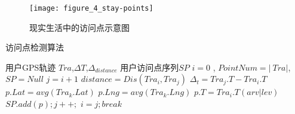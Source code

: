 
\begin{figure}[htp]
\centering
\texttt{[image: figure\_4\_stay-points]}
\caption{现实生活中的访问点示意图}
\label{fig:staypoint}
\end{figure}
\begin{algorithm}[htb]
\caption{访问点检测算法}
\label{alg2_1staypoint}
\begin{algorithmic}[1] %
				\REQUIRE 用户GPS轨迹 $Tra$,$\Delta T$,$\Delta_{distance}$
				\ENSURE 用户访问点序列$SP$
				\STATE $i = 0$ , $PointNum= \left| \ Tra \right|$,$SP = Null$
				\STATE $j = i+1$
				\STATE $distance=Dis(Tra_{i},Tra_{j})$
				\STATE $\Delta_{t}=Tra_{j}.T-Tra_{i}.T$
				\STATE $p.Lat = avg(Tra_{k}.Lat)  $
				\STATE $p.Lng = avg(Tra_{k}.Lng)$
				\STATE $p.T = Tra_{i}.T(arv|lev)$%
				\STATE $SP .add(p) ;j++; $
				\ENDIF				
				\ENDIF				
				\ENDWHILE
				\STATE $i=j ; break$
				\ENDWHILE
\end{algorithmic}
\end{algorithm}


